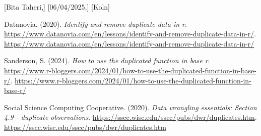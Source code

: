 \documentclass[
  man,
  floatsintext,
  longtable,
  nolmodern,
  notxfonts,
  notimes,
  colorlinks=true,linkcolor=blue,citecolor=blue,urlcolor=blue]{apa7}
\newlength{\cslhangindent}
\newenvironment{CSLReferences}[2] %
 {\begin{list}{}{%
  \setlength{\itemindent}{0pt}
  \setlength{\leftmargin}{0pt}
  \setlength{\parsep}{0pt}
  \ifodd #1
   \setlength{\leftmargin}{\cslhangindent}
   \setlength{\itemindent}{-1\cslhangindent}
  \fi
  \setlength{\itemsep}{#2\baselineskip}}}
 {\end{list}}
\begin{document}
{[}Bita Taheri,{]} {[}06/04/2025,{]} {[}Koln{]}

\label{refs}
\begin{CSLReferences}{1}{0}
Datanovia. (2020). \emph{Identify and remove duplicate data in r}.
\url{https://www.datanovia.com/en/lessons/identify-and-remove-duplicate-data-in-r/}.
\url{https://www.datanovia.com/en/lessons/identify-and-remove-duplicate-data-in-r/}

Sanderson, S. (2024). \emph{How to use the duplicated function in base
r}.
\url{https://www.r-bloggers.com/2024/01/how-to-use-the-duplicated-function-in-base-r/}.
\url{https://www.r-bloggers.com/2024/01/how-to-use-the-duplicated-function-in-base-r/}

Social Science Computing Cooperative. (2020). \emph{Data wrangling
essentials: Section 4.9 - duplicate observations}.
\url{https://sscc.wisc.edu/sscc/pubs/dwr/duplicates.htm}.
\url{https://sscc.wisc.edu/sscc/pubs/dwr/duplicates.htm}

\end{CSLReferences}
\end{document}
